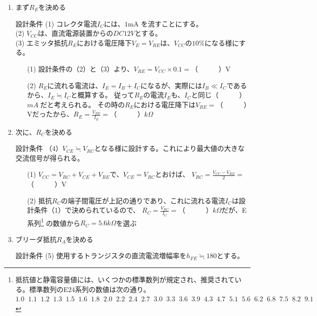 \documentclass[uplatex,a4paper,11pt,oneside,openany]{jsbook}
\begin{document}
\begin{enumerate}
  \item まず$R_E$を決める\\
  \begin{itembox}[l]{設計条件}
  (1) コレクタ電流$I_C$には、$1$mA を流すことにする。\\
  (2) $V_{CC}$は、直流電源装置からの$DC12V$とする。\\
  (3) エミッタ抵抗$R_E$における電圧降下$V_E=V_{RE}$は、$V_{CC}$の$10\%$になる様にする。
  \end{itembox}
  \begin{enumerate}
  \item[(1)] 設計条件の（2）と（3）より、$V_{RE}=V_{CC}\times 0.1=$（　　　）V
  \item[(2)] $R_E$に流れる電流は、$I_E=I_B+I_C$になるが、実際には$I_B\ll I_C$であるから、$I_E\fallingdotseq I_C$と概算する。
  従って$R_E$の電流$I_E$も、$I_C$と同じ（　　　）$mA\;$だと考えられる。
  その時の$R_E$における電圧降下は$V_{RE}=$（　　　）Vだったから、$R_E=\displaystyle\frac{V_{RE}}{I_E}=$（　　　）$k\Omega$
  \end{enumerate}
  \vfill
  \item 次に、$R_C$を決める\\
  \begin{itembox}[l]{設計条件}
  （4）$V_{CE}\fallingdotseq V_{RC}$となる様に設計する。これにより最大値の大きな交流信号が得られる。
  \end{itembox}
  \begin{enumerate}
  \item[(1)] $V_{CC}=V_{RC}+V_{CE}+V_{RE}$で、$V_{CE}=V_{RC}$とおけば、
  $V_{RC}=\displaystyle\frac{V_{CC}-V_{RE}}{2}=$（　　　）V
  \item[(2)] 抵抗$R_C$の端子間電圧が上記の通りであり、これに流れる電流$I_C$は設計条件（1）で決められているので、
  $R_C=\displaystyle\frac{V_{RC}}{I_C}=$（　　　）$k\Omega$だが、E系列\footnote{抵抗値と静電容量値には、いくつかの標準数列が規定され、推奨されている。標準数列のE24系列の数値は次の通り。\\
  $1.0\;\;1.1\;\;1.2\;\;1.3\;\;1.5\;\;1.6\;\;1.8\;\;2.0\;\;2.2\;\;2.4\;\;2.7\;\;3.0\;\;3.3\;\;3.6\;\;3.9\;\;4.3\;\;4.7\;\;5.1\;\;5.6\;\;6.2\;\;6.8\;\;7.5\;\;8.2\;\;9.1$}
  の数値から$R_C=5.6k\Omega$を選ぶ
  \end{enumerate}
  \vfill
  \item ブリーダ抵抗$R_A$を決める\\
  \begin{itembox}[l]{設計条件}
  (5) 使用するトランジスタの直流電流増幅率を$h_{FE}\fallingdotseq 180$とする。\\

\end{itembox}
\end{enumerate}
\end{document}
